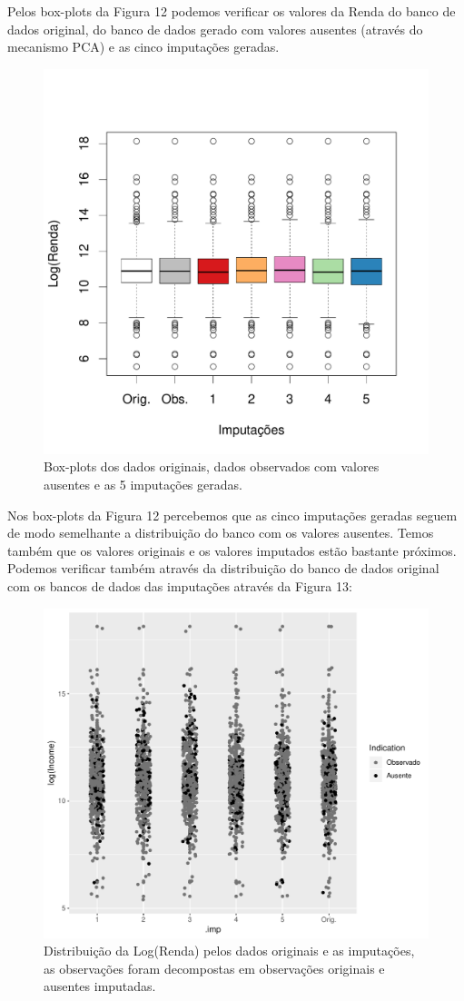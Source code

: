 \documentclass[]{article}
\begin{document}
Pelos box-plots da Figura 12 podemos verificar os valores da Renda do
banco de dados original, do banco de dados gerado com valores ausentes
(através do mecanismo PCA) e as cinco imputações geradas.

\begin{figure}[H]

{\centering \includegraphics[width=0.6\linewidth]{p57-graf} 

}

\caption{Box-plots dos dados originais, dados observados com valores ausentes e as 5 imputações geradas.}\label{fig:unnamed-chunk-20}
\end{figure}

Nos box-plots da Figura 12 percebemos que as cinco imputações geradas
seguem de modo semelhante a distribuição do banco com os valores
ausentes. Temos também que os valores originais e os valores imputados
estão bastante próximos. Podemos verificar também através da
distribuição do banco de dados original com os bancos de dados das
imputações através da Figura 13:

\begin{figure}[H]

{\centering \includegraphics[width=0.6\linewidth]{Relatorio_IC_files/figure-latex/unnamed-chunk-21-1} 

}

\caption{Distribuição da Log(Renda) pelos dados originais e as imputações, as observações foram decompostas em observações originais e ausentes imputadas.}\label{fig:unnamed-chunk-21}
\end{figure}
\end{document}
